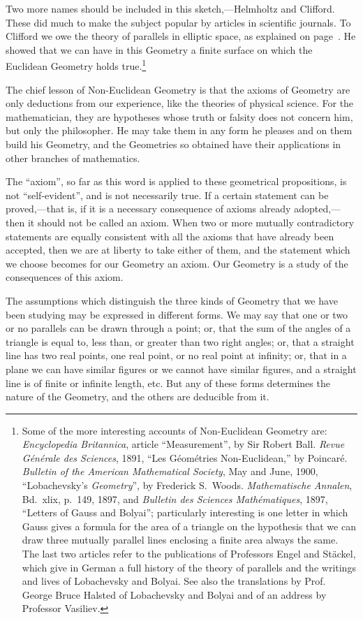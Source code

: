 Two more names should be included in this sketch,---Helmholtz and
Clifford. These did much to make the subject popular by articles in
scientific journals. To Clifford we owe the theory of parallels in
elliptic space, as explained on page~\pageref{p68ref}. He showed
that we can have in this Geometry a finite surface on which the
Euclidean Geometry holds true.\footnote{Some of the more interesting
accounts of Non-Euclidean Geometry are: \emph{Encyclopedia
Britannica}, article ``Measurement'', by Sir Robert Ball.
\emph{Revue Générale des Sciences}, 1891, ``Les Géométries
Non-Euclidean,'' by Poincaré. \emph{Bulletin of the American
Mathematical Society}, May and June, 1900, ``Lobachevsky's
\emph{Geometry}'', by Frederick S.~Woods. \emph{Mathematische
Annalen}, Bd.~xlix, p.~149, 1897, and \emph{Bulletin des Sciences
Mathématiques}, 1897, ``Letters of Gauss and Bolyai''; particularly
interesting is one letter in which Gauss gives a formula for the
area of a triangle on the hypothesis that we can draw three mutually
parallel lines enclosing a finite area always the same. The last two
articles refer to the publications of Professors Engel and Stäckel,
which give in German a full history of the theory of parallels and
the writings and lives of Lobachevsky and Bolyai. See also the
translations by Prof. George Bruce Halsted of Lobachevsky and Bolyai
and of an address by Professor Vasiliev.}

The chief lesson of Non-Euclidean Geometry is that the axioms of
Geometry are only deductions from our experience, like the theories
of physical science. For the mathematician, they are hypotheses
whose truth or falsity does not concern him, but only the
philosopher. He may take them in any form he pleases and on them
build his Geometry, and the Geometries so obtained have their
applications in other branches of mathematics.

The ``axiom'', so far as this word is applied to these geometrical
propositions, is not ``self-evident'', and is not necessarily true.
If a certain statement can be proved,---that is, if it is a
necessary consequence of axioms already adopted,---then it should
not be called an axiom. When two or more mutually contradictory
statements are equally consistent with all the axioms that have
already been accepted, then we are at liberty to take either of
them, and the statement which we choose becomes for our Geometry an
axiom. Our Geometry is a study of the consequences of this axiom.

The assumptions which distinguish the three kinds of Geometry that
we have been studying may be expressed in different forms. We may
say that one or two or no parallels can be drawn through a point;
or, that the sum of the angles of a triangle is equal to, less than,
or greater than two right angles; or, that a straight line has two
real points, one real point, or no real point at infinity; or, that
in a plane we can have similar figures or we cannot have similar
figures, and a straight line is of finite or infinite length, etc.
But any of these forms determines the nature of the Geometry, and
the others are deducible from it.

\newpage
